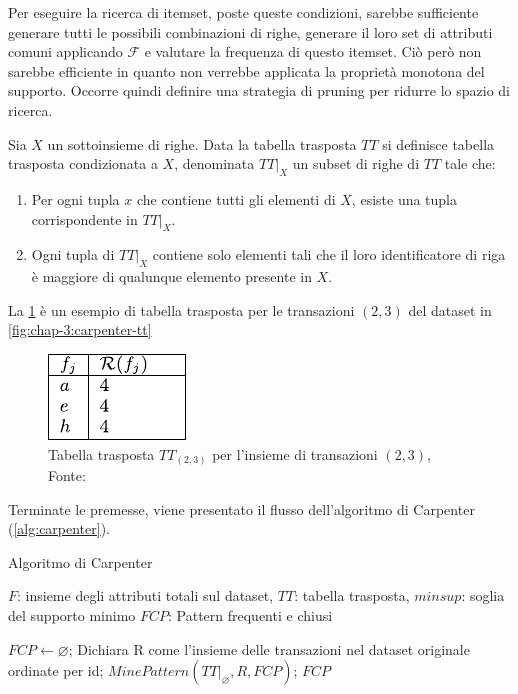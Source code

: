 Per eseguire la ricerca di itemset, poste queste condizioni, sarebbe sufficiente generare tutti le possibili combinazioni di righe, generare il loro set di attributi comuni applicando \(\mathcal{F}\) e valutare la frequenza di questo itemset.
Ciò però non sarebbe efficiente in quanto non verrebbe applicata la proprietà monotona del supporto.
Occorre quindi definire una strategia di pruning per ridurre lo spazio di ricerca.

Sia \(X\) un sottoinsieme di righe.
Data la tabella trasposta \(TT\) si definisce tabella trasposta condizionata a \(X\), denominata \(TT|_{X}\) un subset di righe di \(TT\) tale che:

\begin{enumerate}
    \item Per ogni tupla \(x\) che contiene tutti gli elementi di \(X\), esiste una tupla corrispondente in \(TT|_{X}\).
    \item Ogni tupla di \(TT|_{X}\) contiene solo elementi tali che il loro identificatore di riga è maggiore di qualunque elemento presente in \(X\).
\end{enumerate}

La \cref{fig:chap-3:carpenter-ttt} è un esempio di tabella trasposta per le transazioni \((2,3)\) del dataset in \cref{fig:chap-3:carpenter-tt}

\begin{figure}
  \centering
  \includegraphics[width=.5\textwidth]{res/fig/sec-3/TT23.pdf}
  \caption{Tabella trasposta \(TT_{(2,3)}\) per l'insieme di transazioni \((2, 3)\), Fonte:~\cite{pan2003carpenter}}%
  \label{fig:chap-3:carpenter-ttt}
\end{figure}


Terminate le premesse, viene presentato il flusso dell'algoritmo di Carpenter (\cref{alg:carpenter}).

\begin{algorithm}[H]
\caption{Algoritmo di Carpenter}\label{alg:carpenter}
\begin{algorithmic}[1]
\Require \(F\): insieme degli attributi totali sul dataset, \(TT\): tabella trasposta, \(minsup\): soglia del supporto minimo
\Ensure \(FCP\): Pattern frequenti e chiusi

\State \(FCP \gets \varnothing\); 
\State Dichiara R come l'insieme delle transazioni nel dataset originale ordinate per id;
\State$ MinePattern(TT|_{\varnothing}, R, FCP)$;
\State \Return \(FCP\)
\end{algorithmic}
\end{algorithm}

